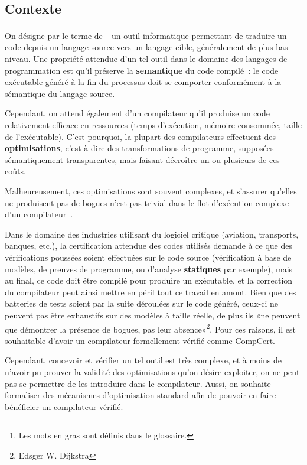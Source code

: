 \documentclass{article}
\begin{document}
\subsection{Contexte}

On désigne par le terme de {\bf
{}}\footnote{Les mots en gras sont définis dans
le glossaire.} un outil informatique permettant de traduire un code depuis un
langage source vers un langage cible, généralement de plus bas niveau. Une
propriété attendue d'un tel outil dans le domaine des langages de programmation
est qu'il préserve la {\bf \gls{semantique}} du code compilé~: le code
exécutable généré à la fin du processus doit se comporter conformément à la
sémantique du langage source.

Cependant, on attend également d'un compilateur qu'il produise un code
relativement efficace en ressources (temps d'exécution, mémoire consommée,
taille de l'exécutable). C'est pourquoi, la plupart des compilateurs effectuent
des {\bf \glspl{optimisation}}, c'est-à-dire des transformations de programme,
supposées sémantiquement transparentes, mais faisant décroître un ou plusieurs
de ces coûts.

Malheureusement, ces optimisations sont souvent complexes, et s'assurer
qu'elles ne produisent pas de bogues n'est pas trivial dans le flot d'exécution
complexe d'un compilateur~\cite{Yang11}.

Dans le domaine des industries utilisant du logiciel critique (aviation,
transports, banques, etc.), la certification attendue des codes utilisés
demande à ce que des vérifications poussées soient effectuées sur le code
source (vérification à base de modèles, de preuves de programme, ou d'analyse
{\bf \glspl{statique}} par exemple), mais au final, ce code doit être compilé
pour produire un exécutable, et la correction du compilateur peut ainsi mettre
en péril tout ce travail en amont. Bien que des batteries de tests soient par
la suite déroulées sur le code généré, ceux-ci ne peuvent pas être exhaustifs
sur des modèles à taille réelle, de plus ils «ne peuvent que démontrer la
présence de bogues, pas leur absence»\footnote{Edsger W. Dijkstra}. Pour ces
raisons, il est souhaitable d'avoir un compilateur formellement vérifié comme
CompCert.

Cependant, concevoir et vérifier un tel outil est très complexe, et à moins de
n'avoir pu prouver la validité des optimisations qu'on désire exploiter, on ne
peut pas se permettre de les introduire dans le compilateur. Aussi, on souhaite
formaliser des mécanismes d'optimisation standard afin de pouvoir en faire
bénéficier un compilateur vérifié.
\end{document}
